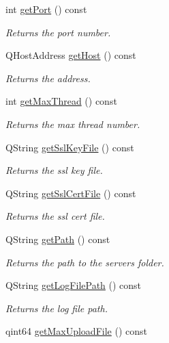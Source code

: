 \begin{DoxyCompactItemize}
int \hyperlink{class_configuration_ab34eb25aa1e175c7ac8323300b298a8a}{get\+Port} () const
\begin{DoxyCompactList}\small\item\em Returns the port number. \end{DoxyCompactList}\item 
Q\+Host\+Address \hyperlink{class_configuration_a37ca7476a8ab5a1e6c4b5a3e07670d9f}{get\+Host} () const
\begin{DoxyCompactList}\small\item\em Returns the address. \end{DoxyCompactList}\item 
int \hyperlink{class_configuration_ad0e836129d0a7e0111b1f2c092729939}{get\+Max\+Thread} () const
\begin{DoxyCompactList}\small\item\em Returns the max thread number. \end{DoxyCompactList}\item 
Q\+String \hyperlink{class_configuration_a96082bdd3333d8ddf2017a95fe302225}{get\+Ssl\+Key\+File} () const
\begin{DoxyCompactList}\small\item\em Returns the ssl key file. \end{DoxyCompactList}\item 
Q\+String \hyperlink{class_configuration_a10405dacfb3b61f60b290c0a5d79a8fb}{get\+Ssl\+Cert\+File} () const
\begin{DoxyCompactList}\small\item\em Returns the ssl cert file. \end{DoxyCompactList}\item 
Q\+String \hyperlink{class_configuration_a43acf80f787217903281b0a6d3e01e11}{get\+Path} () const
\begin{DoxyCompactList}\small\item\em Returns the path to the server\textquotesingle{}s folder. \end{DoxyCompactList}\item 
Q\+String \hyperlink{class_configuration_a005e1d10c605e08d73ff274f2b19fc48}{get\+Log\+File\+Path} () const
\begin{DoxyCompactList}\small\item\em Returns the log file path. \end{DoxyCompactList}\item 
qint64 \hyperlink{class_configuration_a8bc88e3cfe151837ee77e213e441953e}{get\+Max\+Upload\+File} () const

\end{DoxyCompactItemize}
